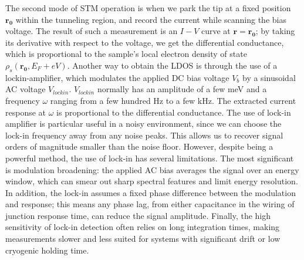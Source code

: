 The second mode of \ac{STM} operation is when we park the tip at a fixed position $\mathbf{r_0}$ within the tunneling region, and record the current while scanning the bias voltage. The result of such a measurement is an $I-V$ curve at $\mathbf{r} = \mathbf{r_0}$; by taking its derivative with respect to the voltage, we get the differential conductance, which is proportional to the sample's local electron density of state $\rho_s(\mathbf{r_0}, E_F+eV)$. Another way to obtain the LDOS is through the use of a lockin-amplifier, which modulates the applied DC bias voltage $V_b$ by a sinusoidal AC voltage $V_{lockin}$.  $V_{lockin}$ normally has an amplitude of a few meV and a frequency $\omega$ ranging from a few hundred Hz to a few kHz. The extracted current response at $\omega$ is proportional to the differential conductance. The use of lock-in amplifier is particular useful in a noisy environment, since we can choose the lock-in frequency away from any noise peaks. This allows us to recover signal orders of magnitude smaller than the noise floor. However, despite being a powerful method, the use of lock-in has several limitations. The most significant is modulation broadening: the applied AC bias averages the signal over an energy window, which can smear out sharp spectral features and limit energy resolution. In addition, the lock-in assumes a fixed phase difference between the modulation and response; this means any phase lag, from either capacitance in the wiring of junction response time, can reduce the signal amplitude. Finally, the high sensitivity of lock-in detection often relies on long integration times, making measurements slower and less suited for systems with significant drift or low cryogenic holding time.

